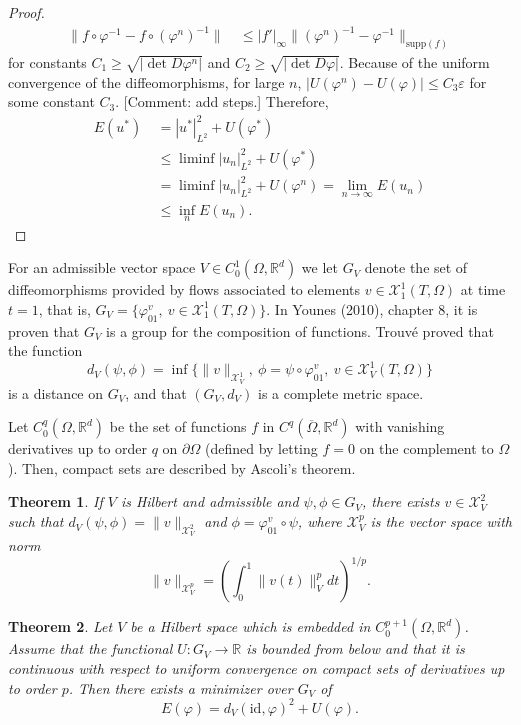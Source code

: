 \documentclass{article}
\theoremstyle{plain}
\newtheorem{teo}{Theorem}[section]
\theoremstyle{definition}
\newcommand{\R}{\ensuremath{\mathbb{R}}}
\newcommand{\id}{\ensuremath{\mathrm{id}}}
\begin{document}
\begin{proof}
\begin{align*}
\|f\circ \varphi^{-1}-f\circ(\varphi^n)^{-1}\|&\ \leq |f'|_\infty\|(\varphi^n)^{-1}-\varphi^{-1}\|_{\mathrm{supp}(f)} 
\end{align*}
%
for constants $C_1\geq \sqrt{|\det D\varphi^n|}$ and $C_2\geq \sqrt{|\det D\varphi|}$. Because of the uniform convergence of the diffeomorphisms, for large $n$, $|U(\varphi^n)-U(\varphi)|\leq C_3\varepsilon$ for some constant $C_3$. [Comment: add steps.]
Therefore,
\begin{align*}
E(u^*) \ &= |u^*|^2_{L^2} + U(\varphi^*)\\
&\leq \liminf |u_n|^2_{L^2} + U(\varphi^*)\\
&= \liminf |u_n|^2_{L^2} + U(\varphi^n) = \lim_{n\to\infty} E(u_n)\\
&\leq \inf_n E(u_n).
\end{align*} 
\end{proof}

For an admissible vector space $V\in C_0^1(\Omega,\R^d)$ we let $G_V$ denote the set of diffeomorphisms provided by flows associated to elements $v\in \mathcal{X}_1^1(T,\Omega)$ at time $t=1$, that is, $G_V=\{\varphi_{01}^v,\ v\in \mathcal{X}_1^1(T,\Omega)\}.$ In Younes (2010), chapter 8, it is proven that $G_V$ is a group for the composition of functions. Trouvé proved that
the function
\[
d_V(\psi,\phi)=\inf\{\|v\|_{\mathcal{X}_V^1},\ \phi=\psi\circ\varphi_{01}^v,\ v\in \mathcal{X}_V^1(T,\Omega)\}
\]
is  a  distance  on $G_V$, and that $(G_V,d_V)$ is a complete metric space.

Let $C_0^q(\Omega,\R^d)$ be the set of functions $f$ in $C^q(\overline{\Omega},\R^d)$ with vanishing derivatives up to order $q$ on $\partial\Omega$ (defined by letting $f=0$ on the complement to $\Omega$). Then, compact sets are described by Ascoli's theorem.

\begin{teo}
If $V$ is Hilbert and admissible and $\psi,\phi\in G_V$, there exists $v\in\mathcal{X}_V^2$ such that $d_V(\psi,\phi)=\|v\|_{\mathcal{X}_V^2}$ and $\phi=\varphi_{01}^v\circ\psi$, where  $\mathcal{X}_V^p$ is the vector space with norm
\[
\|v\|_{\mathcal{X}_V^p}=\left(\int_0^1 \|v(t)\|_V^p dt\right)^{1/p}.
\]
\end{teo}

\begin{teo}
Let $V$ be a Hilbert space which is embedded in $C_0^{p+1}(\Omega,\R^d)$. Assume that the functional $U:G_V\to\R$ is bounded from below and that it is continuous with respect to uniform convergence on compact sets of derivatives up to order $p$. Then there exists a minimizer over $G_V$ of \[E(\varphi)=d_V(\id,\varphi)^2+U(\varphi).\]
\end{teo}
\end{document}
